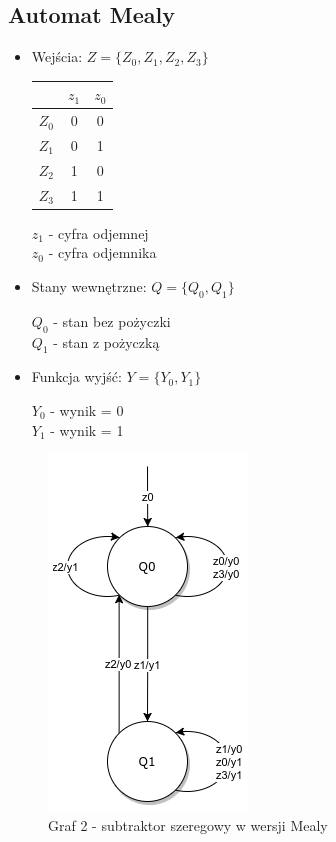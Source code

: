 \documentclass[12pt,a4paper]{article}
\begin{document}
		\subsection{Automat Mealy}
			\begin{itemize}
				\item Wejścia: \(Z = \{Z_0, Z_1, Z_2, Z_3\}\)\\
				
				\begin{minipage}{{.5\textwidth}}
					\centering
					\begin{tabular}{r|cc}
						&	\(z_1\)	&	\(z_0\)\\\hline
						\(Z_0\)	&	0	&	0	\\
						\(Z_1\)	&	0	&	1	\\
						\(Z_2\)	&	1	&	0	\\
						\(Z_3\)	&	1	&	1	\\
					\end{tabular}
				\end{minipage}%
				\begin{minipage}{{.5\textwidth}}	
					
					\(z_1\) - cyfra odjemnej\\
					\(z_0\) - cyfra odjemnika
				\end{minipage}
				
				\item Stany wewnętrzne: \(Q =\{Q_0, Q_1\}\)
					
					\(Q_0\) - stan bez pożyczki\\
					\(Q_1\) - stan z pożyczką
					
				\item Funkcja wyjść: \(Y=\{Y_0, Y_1\}\)
					
					\(Y_0\) - wynik = 0\\
					\(Y_1\) - wynik = 1
			\end{itemize}
			
			\begin{figure}[H]
				\centering
				\includegraphics[width=.25\textwidth]{schem/diag2.png}
				\\
				\vspace{.1cm}
				Graf 2 - subtraktor szeregowy w wersji Mealy
			\end{figure}
		
\end{document}
